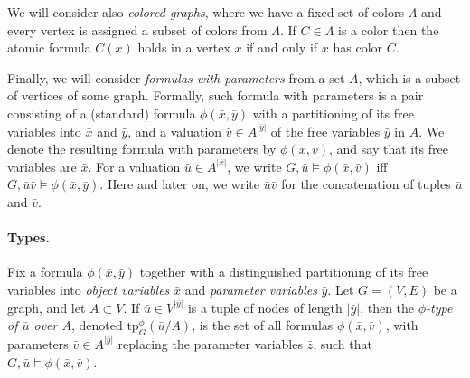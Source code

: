 We will consider also \emph{colored graphs},
where we have a fixed set of colors $\Lambda$ and every vertex is assigned a subset of colors from 
$\Lambda$. If $C\in \Lambda$ is a color then the atomic formula $C(x)$ holds in a vertex $x$ if and only if $x$ has color $C$.

Finally, we will consider \emph{formulas with parameters}
from a set $A$, which is a subset of vertices of some graph.
Formally, such formula with parameters is a pair consisting of a (standard) formula $\phi(\bar x,\bar y)$
with a partitioning of its free variables into $\bar x$ and $\bar y$,
and a valuation $\bar v\in A^{|\bar y|}$ of the free variables $\bar y$ in $A$.
We denote the resulting formula with parameters by $\phi(\bar x,\bar v)$, and say that its free variables 
are $\bar x$. For a valuation $\bar u\in A^{|\bar x|}$,
we write $G,\bar u\models \phi(\bar x,\bar v)$
iff $G,\bar u\bar v\models \phi(\bar x,\bar y)$. Here and later on, we write $\bar u\bar v$ for the concatenation of tuples $\bar u$ and $\bar v$.

\newcommand{\tp}{\mathrm{tp}}

\paragraph{Types.}
Fix a formula $\phi(\bar x,\bar y)$ together with a distinguished partitioning of its free variables into 
\emph{object variables} $\bar x$ and \emph{parameter variables} $\bar y$. 
Let $G=(V,E)$ be a graph, and let $A\subset V$.
If $\bar u\in V^{|\bar y|}$ is a tuple of 
nodes of length $|\bar y|$, then the 
\emph{$\phi$-type of $\bar u$ over $A$},
denoted $\tp^\phi_G(\bar u/A)$,
is the set of all
formulas $\phi(\bar x,\bar v)$,
with parameters $\bar v\in A^{|\bar y|}$
replacing the parameter variables $\bar z$,
such that $G,\bar u\models \phi(\bar x,\bar v)$.

